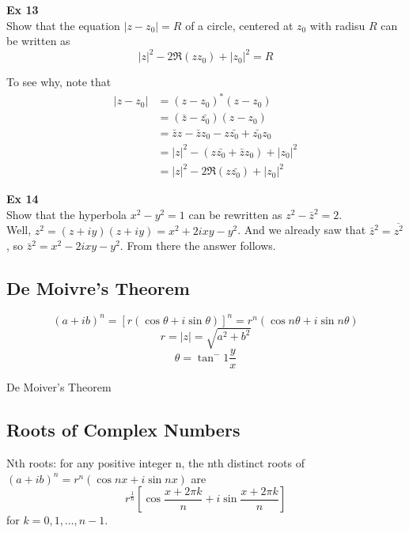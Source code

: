 \textbf{Ex 13}
\\
Show that the equation $|z - z_0| = R$ of a circle, centered at $z_0$ with radisu $R$
can be written as
$$
|z|^2 - 2\Re(zz_0) + |z_0|^2 = R
$$

To see why, note that
\begin{align*}
|z - z_0| &= (z - z_0)^* (z - z_0) \\
    &= (\bar{z} - \bar{z_0}) (z - z_0) \\
    &= \bar{z}z - \bar{z}z_0 - z\bar{z_0} + \bar{z_0}z_0 \\
    &= |z|^2 - (z\bar{z_0} + \bar{z}z_0) + |z_0|^2 \\
    &= |z|^2 - 2\Re(z\bar{z_0}) + |z_0|^2
\end{align*}


\textbf{Ex 14}
\\
Show that the hyperbola $x^2 - y^2 = 1$ can be rewritten as $z^2 - \bar{z}^2 = 2$.
\\

Well, $z^2 = (z + iy)(z + iy) = x^2 + 2ixy - y^2$.
And we already saw that $\bar{z}^2 = \overline{z^2}$, so $\bar{z}^2 = x^2 - 2ixy - y^2$.
From there the answer follows.



\subsection{De Moivre's Theorem}
$$
(a + ib)^n = [r(\cos \theta + i \sin \theta)]^n = r^n (\cos n\theta + i \sin n\theta)
$$
$$
r = |z| = \sqrt{a^2 + b^2}
$$
$$
\theta = \tan^-1 \frac{y}{x}
$$

De Moiver's Theorem 

\subsection{Roots of Complex Numbers}

Nth roots: for any positive integer n, the nth distinct roots of
$(a+ ib)^n = r^n (\cos nx +i\sin nx)$ are
$$
r^{\frac{1}{n}} \left[\cos \frac{x + 2\pi k}{n} + i\sin \frac{x + 2\pi k}{n}\right]
$$
for $k = 0, 1, \dots, n-1$.